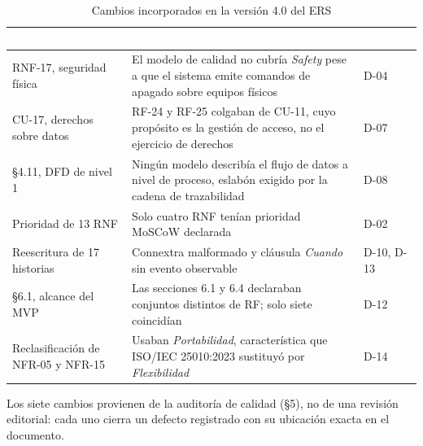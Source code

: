 \begin{table}[H]
\centering
\small
\begin{tabular}{|p{4.3cm}|p{8.4cm}|l|}
\hline
\cellcolor{sigagreen}\textcolor{white}{\textbf{Cambio}} & \cellcolor{sigagreen}\textcolor{white}{\textbf{Motivo}} & \cellcolor{sigagreen}\textcolor{white}{\textbf{Defecto}} \\ \hline
RNF-17, seguridad f\'isica & El modelo de calidad no cubr\'ia \emph{Safety} pese a que el sistema emite comandos de apagado sobre equipos f\'isicos & D-04 \\ \hline
CU-17, derechos sobre datos & RF-24 y RF-25 colgaban de CU-11, cuyo prop\'osito es la gesti\'on de acceso, no el ejercicio de derechos & D-07 \\ \hline
\S4.11, DFD de nivel 1 & Ning\'un modelo describ\'ia el flujo de datos a nivel de proceso, eslab\'on exigido por la cadena de trazabilidad & D-08 \\ \hline
Prioridad de 13 RNF & Solo cuatro RNF ten\'ian prioridad MoSCoW declarada & D-02 \\ \hline
Reescritura de 17 historias & Connextra malformado y cl\'ausula \emph{Cuando} sin evento observable & D-10, D-13 \\ \hline
\S6.1, alcance del MVP & Las secciones 6.1 y 6.4 declaraban conjuntos distintos de RF; solo siete coincid\'ian & D-12 \\ \hline
Reclasificaci\'on de NFR-05 y NFR-15 & Usaban \emph{Portabilidad}, caracter\'istica que ISO/IEC 25010:2023 sustituy\'o por \emph{Flexibilidad} & D-14 \\ \hline
\end{tabular}
\caption{Cambios incorporados en la versi\'on 4.0 del ERS}
\label{tab:cambios-v4}
\end{table}

Los siete cambios provienen de la auditor\'ia de calidad (\S5), no de una revisi\'on editorial: cada uno cierra un defecto registrado con su ubicaci\'on exacta en el documento.
